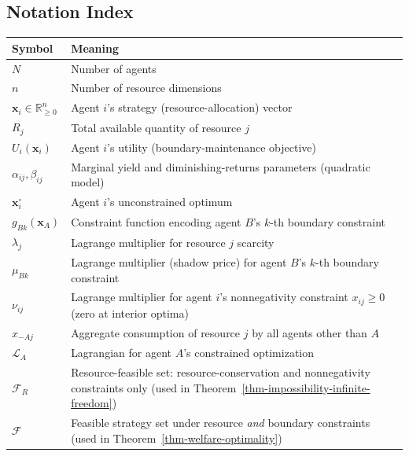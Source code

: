 \documentclass[11pt]{article}
\theoremstyle{plain}
\theoremstyle{definition}
\theoremstyle{remark}
\newcounter{none}
\let\origsubsection\subsection
\renewcommand{\subsection}{\needspace{7\baselineskip}\origsubsection}
\begin{document}
\subsection{Notation Index}\label{notation-index}

{\def\LTcaptype{none} %
\begin{longtable}[]{@{}
  >{\raggedright\arraybackslash}p{}
  >{\raggedright\arraybackslash}p{}@{}}
\toprule\noalign{}
\begin{minipage}[b]{\linewidth}\raggedright
Symbol
\end{minipage} & \begin{minipage}[b]{\linewidth}\raggedright
Meaning
\end{minipage} \\
\midrule\noalign{}
\endhead
\bottomrule\noalign{}
\endlastfoot
\(N\) & Number of agents \\
\(n\) & Number of resource dimensions \\
\(\mathbf{x}_i \in \mathbb{R}_{\geq 0}^n\) & Agent \(i\)'s strategy
(resource-allocation) vector \\
\(R_j\) & Total available quantity of resource \(j\) \\
\(U_i(\mathbf{x}_i)\) & Agent \(i\)'s utility (boundary-maintenance
objective) \\
\(\alpha_{ij}, \beta_{ij}\) & Marginal yield and diminishing-returns
parameters (quadratic model) \\
\(\mathbf{x}_i^{\circ}\) & Agent \(i\)'s unconstrained optimum \\
\(g_{Bk}(\mathbf{x}_A)\) & Constraint function encoding agent \(B\)'s
\(k\)-th boundary constraint \\
\(\lambda_j\) & Lagrange multiplier for resource \(j\) scarcity \\
\(\mu_{Bk}\) & Lagrange multiplier (shadow price) for agent \(B\)'s
\(k\)-th boundary constraint \\
\(\nu_{ij}\) & Lagrange multiplier for agent \(i\)'s nonnegativity
constraint \(x_{ij} \geq 0\) (zero at interior optima) \\
\(\hat{x}_{-Aj}\) & Aggregate consumption of resource \(j\) by all
agents other than \(A\) \\
\(\mathcal{L}_A\) & Lagrangian for agent \(A\)'s constrained
optimization \\
\(\mathcal{F}_R\) & Resource-feasible set: resource-conservation and
nonnegativity constraints only (used in
Theorem~\ref{thm-impossibility-infinite-freedom}) \\
\(\mathcal{F}\) & Feasible strategy set under resource \emph{and}
boundary constraints (used in Theorem~\ref{thm-welfare-optimality}) \\
\end{longtable}
}
\end{document}
